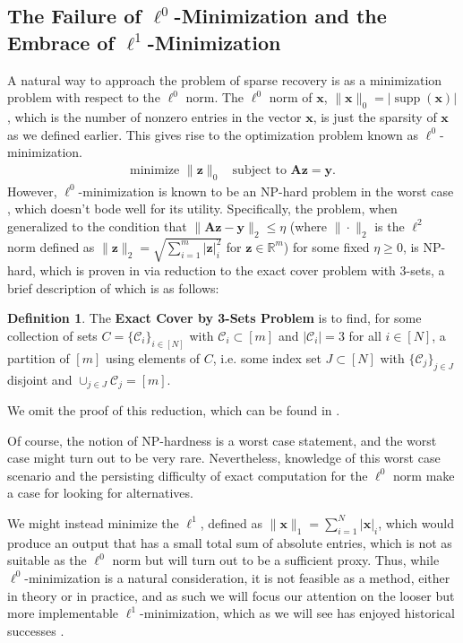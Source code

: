 \documentclass[12pt,a4paper]{amsart}
\numberwithin{equation}{section}
\theoremstyle{plain}
\theoremstyle{definition}
\newtheorem{Def}[Th]{Definition}
\newcommand{\BR}{\mathbb R}
\newcommand{\bdy}{\mathbf{y}}
\newcommand{\bdx}{\mathbf{x}}
\newcommand{\bdz}{\mathbf{z}}
\newcommand{\bdA}{\mathbf{A}}
\DeclareMathOperator{\supp}{supp}
\begin{document}
\subsection*{The Failure of $\ell^0$-Minimization and the Embrace of $\ell^1$-Minimization}

A natural way to approach the problem of sparse recovery is as a minimization problem with respect to the $\ell^0$ norm. The $\ell^0$ norm of $\bdx$, $\|\bdx\|_0=|\supp(\bdx)|$, which is the number of nonzero entries in the vector $\bdx$, is just the sparsity of $\bdx$ as we defined earlier. This gives rise to the optimization problem known as $\ell^0$-minimization.
\begin{align} \label{l0}
    \text{minimize } \|\bdz\|_0 \ \ \ \ \text{subject to } \bdA\bdz=\bdy.
\end{align}
However, $\ell^0$-minimization is known to be an NP-hard problem in the worst case \cite{fou-rau}, which doesn't bode well for its utility. Specifically, the problem, when generalized to the condition that $\|\bdA\bdz-\bdy\|_2\leq\eta$ (where $\|\cdot\|_2$ is the $\ell^2$ norm defined as $\|\bdz\|_2=\sqrt{\sum_{i=1}^m|\bdz|_i^2}$ for $\bdz\in\BR^m$) for some fixed $\eta\geq0$, is NP-hard, which is proven in \cite{fou-rau} via reduction to the exact cover problem with 3-sets, a brief description of which is as follows:

\begin{Def}\label{exact-cover} The \textbf{Exact Cover by 3-Sets Problem} is to find, for some collection of sets $C=\{\mathcal{C}_i\}_{i\in[N]}$ with $\mathcal{C}_i\subset[m]$ and $|\mathcal{C}_i|=3$ for all $i\in[N]$, a partition of $[m]$ using elements of $C$, i.e. some index set $J\subset[N]$ with $\{\mathcal{C}_j\}_{j\in J}$ disjoint and $\cup_{j\in J}\mathcal{C}_j=[m]$.
\end{Def}

We omit the proof of this reduction, which can be found in \cite{fou-rau}.

Of course, the notion of NP-hardness is a worst case statement, and the worst case might turn out to be very rare. Nevertheless, knowledge of this worst case scenario and the persisting difficulty of exact computation for the $\ell^0$ norm \cite{haz-maz} make a case for looking for alternatives.

We might instead minimize the $\ell^1$, defined as $\|\bdx\|_1=\sum_{i=1}^N|\bdx|_i$, which would produce an output that has a small total sum of absolute entries, which is not as suitable as the $\ell^0$ norm but will turn out to be a sufficient proxy. Thus, while $\ell^0$-minimization is a natural consideration, it is not feasible as a method, either in theory or in practice, and as such we will focus our attention on the looser but more implementable $\ell^1$-minimization, which as we will see has enjoyed historical successes \cite{fou-rau, wm}.
\end{document}
